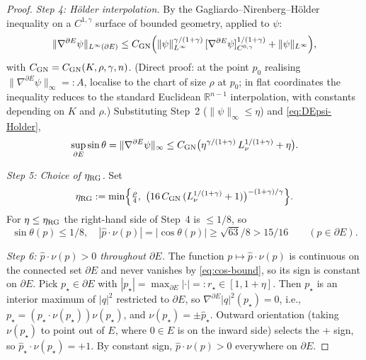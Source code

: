 \documentclass[11pt]{amsart}
\newcommand{\R}{\mathbb R}
\begin{document}
\begin{proof}
\emph{Step 4: Hölder interpolation.}
By the Gagliardo--Nirenberg--Hölder inequality on a
\(C^{1,\gamma}\) surface of bounded geometry, applied to
\(\psi\):
\begin{equation}\label{eq:GN}
   \|\nabla^{\partial E}\psi\|_{L^\infty(\partial E)}
   \le C_{\rm GN}\Bigl(
      \|\psi\|_{L^\infty}^{\gamma/(1+\gamma)}\,
      [\nabla^{\partial E}\psi]_{C^{0,\gamma}}^{1/(1+\gamma)}
      +\|\psi\|_{L^\infty}
   \Bigr),
\end{equation}
with \(C_{\rm GN}=C_{\rm GN}(K,\rho,\gamma,n)\).  \textup{(Direct
proof: at the point \(p_0\) realising \(\|\nabla^{\partial E}\psi\|
_\infty=:A\), localise to the chart of size \(\rho\) at \(p_0\); in
flat coordinates the inequality reduces to the standard Euclidean
\(\R^{n-1}\) interpolation, with constants depending on \(K\) and
\(\rho\).)}  Substituting Step~2 (\(\|\psi\|_\infty\le\eta\)) and
\eqref{eq:DEpsi-Holder},
\[
   \sup_{\partial E}\sin\theta
   =\|\nabla^{\partial E}\psi\|_\infty
   \le C_{\rm GN}\bigl(\eta^{\gamma/(1+\gamma)}\,L_\nu^{1/(1+\gamma)}
      +\eta\bigr).
\]

\emph{Step 5: Choice of $\eta_{\rm RG}$.}
Set
\begin{equation}\label{eq:etaRG-def}
   \eta_{\rm RG}:=\min\Bigl\{\tfrac{\rho}{4},\
      \bigl(16\,C_{\rm GN}\,(L_\nu^{1/(1+\gamma)}+1)\bigr)^{-(1+\gamma)
      /\gamma}\Bigr\}.
\end{equation}
For \(\eta\le\eta_{\rm RG}\) the right-hand side of Step~4 is
\(\le 1/8\), so
\begin{equation}\label{eq:cos-bound}
   \sin\theta(p)\le 1/8,
   \quad
   |\widehat p\cdot\nu(p)|=|\cos\theta(p)|\ge\sqrt{63}/8>15/16
   \qquad(p\in\partial E).
\end{equation}

\emph{Step 6: $\widehat p\cdot\nu(p)>0$ throughout $\partial E$.}
The function \(p\mapsto\widehat p\cdot\nu(p)\) is continuous on the
connected set \(\partial E\) and never vanishes by
\eqref{eq:cos-bound}, so its sign is constant on \(\partial E\).
Pick \(p_\star\in\partial E\) with \(|p_\star|=\max_{\partial
E}|\cdot|=:r_\star\in[1,1+\eta]\).  Then \(p_\star\) is an interior
maximum of \(|q|^{2}\) restricted to \(\partial E\), so
\(\nabla^{\partial E}|q|^2(p_\star)=0\), i.e.,
\(p_\star=(p_\star\cdot\nu(p_\star))\nu(p_\star)\), and
\(\nu(p_\star)=\pm\widehat p_\star\).  Outward orientation (taking
\(\nu(p_\star)\) to point out of \(E\), where \(0\in E\) is on the
inward side) selects the \(+\) sign, so \(\widehat p_\star\cdot
\nu(p_\star)=+1\).  By constant sign, \(\widehat p\cdot\nu(p)>0\)
everywhere on \(\partial E\).


\end{proof}
\end{document}
